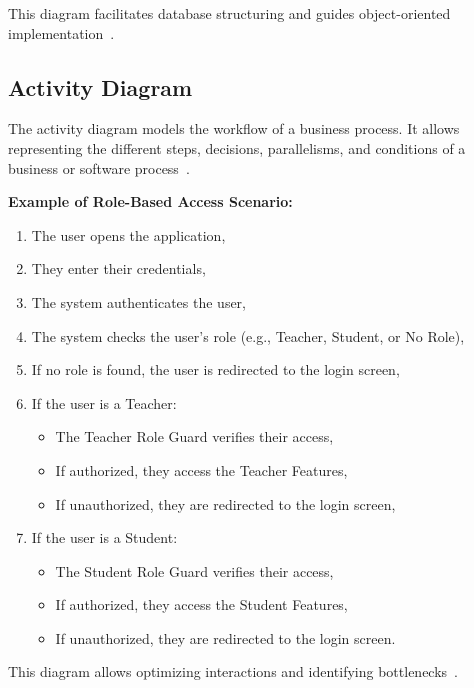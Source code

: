 \documentclass[12pt,a4paper]{report}
\begin{document}
This diagram facilitates database structuring and guides object-oriented implementation~\cite{bruegge2010}.


\newpage
\subsection{Activity Diagram}
The activity diagram models the workflow of a business process. It allows representing the different steps, decisions, parallelisms, and conditions of a business or software process~\cite{fowler2004}.

\textbf{Example of Role-Based Access Scenario:}
\begin{enumerate}
\item The user opens the application,
\item They enter their credentials,
\item The system authenticates the user,
\item The system checks the user’s role (e.g., Teacher, Student, or No Role),
\item If no role is found, the user is redirected to the login screen,
\item If the user is a Teacher:
\begin{itemize}
\item The Teacher Role Guard verifies their access,
\item If authorized, they access the Teacher Features,
\item If unauthorized, they are redirected to the login screen,
\end{itemize}
\item If the user is a Student:
\begin{itemize}
\item The Student Role Guard verifies their access,
\item If authorized, they access the Student Features,
\item If unauthorized, they are redirected to the login screen.
\end{itemize}
\end{enumerate}
This diagram allows optimizing interactions and identifying bottlenecks~\cite{arlow2005}.
\end{document}
